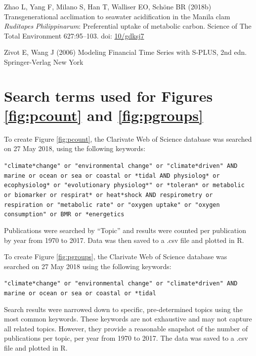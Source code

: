 \documentclass[a4paper,10pt, oneside]{memoir}
\begin{document}
\leavevmode\hypertarget{ref-Zhao2018a}{}%
Zhao L, Yang F, Milano S, Han T, Walliser EO, Schöne BR (2018b) Transgenerational acclimation to seawater acidification in the Manila clam \emph{Ruditapes} \emph{Philippinarum}: Preferential uptake of metabolic carbon. Science of The Total Environment 627:95--103. doi: \href{https://doi.org/10/gdksj7}{10/gdksj7}

\leavevmode\hypertarget{ref-Zivot2006}{}%
Zivot E, Wang J (2006) Modeling Financial Time Series with S-PLUS, 2nd edn. Springer-Verlag New York

\OnehalfSpacing

\appendix

\hypertarget{appendixa}{%
\chapter{Search terms used for Figures \ref{fig:pcount} and \ref{fig:pgroups}}\label{appendixa}}

To create Figure \ref{fig:pcount}, the Clarivate Web of Science database was searched on 27 May 2018, using the following keywords:

\begin{cipher}{}
\texttt{"climate*change" or "environmental change" or "climate*driven" AND marine or ocean or sea or coastal or *tidal AND physiolog* or ecophysiolog* or "evolutionary physiolog*" or *toleran* or metabolic or biomarker or respirat* or heat*shock AND respirometry or respiration or "metabolic rate" or "oxygen uptake" or "oxygen consumption" or BMR or *energetics}
\end{cipher}

Publications were searched by ``Topic'' and results were counted per publication by year from 1970 to 2017. Data was then saved to a .csv file and plotted in R.

To create Figure \ref{fig:pgroups}, the Clarivate Web of Science database was searched on 27 May 2018 using the following keywords:

\begin{cipher}{}
\texttt{"climate*change" or "environmental change" or "climate*driven" AND marine or ocean or sea or coastal or *tidal}
\end{cipher}

Search results were narrowed down to specific, pre-determined topics using the most common keywords. These keywords are not exhaustive and may not capture all related topics. However, they provide a reasonable snapshot of the number of publications per topic, per year from 1970 to 2017. The data was saved to a .csv file and plotted in R.
\end{document}
